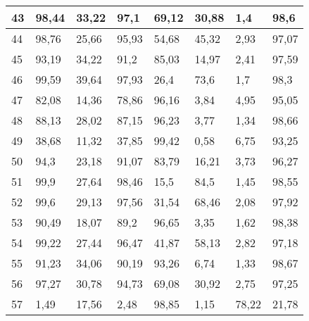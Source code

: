 \begin{longtable}[c]{|l|l|l|l|l|l|l|l|}
43              & 98,44        & 33,22        & 97,1        & 69,12         & 30,88         & 1,4           & 98,6          \\ \hline
44              & 98,76        & 25,66        & 95,93       & 54,68         & 45,32         & 2,93          & 97,07         \\ \hline
45              & 93,19        & 34,22        & 91,2        & 85,03         & 14,97         & 2,41          & 97,59         \\ \hline
46              & 99,59        & 39,64        & 97,93       & 26,4          & 73,6          & 1,7           & 98,3          \\ \hline
47              & 82,08        & 14,36        & 78,86       & 96,16         & 3,84          & 4,95          & 95,05         \\ \hline
48              & 88,13        & 28,02        & 87,15       & 96,23         & 3,77          & 1,34          & 98,66         \\ \hline
49              & 38,68        & 11,32        & 37,85       & 99,42         & 0,58          & 6,75          & 93,25         \\ \hline
50              & 94,3         & 23,18        & 91,07       & 83,79         & 16,21         & 3,73          & 96,27         \\ \hline
51              & 99,9         & 27,64        & 98,46       & 15,5          & 84,5          & 1,45          & 98,55         \\ \hline
52              & 99,6         & 29,13        & 97,56       & 31,54         & 68,46         & 2,08          & 97,92         \\ \hline
53              & 90,49        & 18,07        & 89,2        & 96,65         & 3,35          & 1,62          & 98,38         \\ \hline
54              & 99,22        & 27,44        & 96,47       & 41,87         & 58,13         & 2,82          & 97,18         \\ \hline
55              & 91,23        & 34,06        & 90,19       & 93,26         & 6,74          & 1,33          & 98,67         \\ \hline
56              & 97,27        & 30,78        & 94,73       & 69,08         & 30,92         & 2,75          & 97,25         \\ \hline
57              & 1,49         & 17,56        & 2,48        & 98,85         & 1,15          & 78,22         & 21,78         \\ \hline

\end{longtable}
